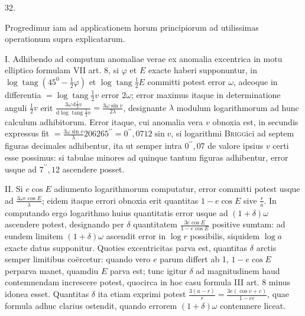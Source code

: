 \begin{center}
\hypertarget{native-047-article032}{}32.
\end{center}
Progredimur iam ad applicationem horum principiorum ad utilissimas operationum supra explicatarum.

I. Adhibendo ad computum anomaliae verae ex anomalia excentrica in motu elliptico formulam VII art. 8, si $\varphi$ et $E$ exacte haberi supponuntur, in $\log\operatorname{tang}(45^0-\frac{1}{2}\varphi)$ et $\log\operatorname{tang}\frac{1}{2}E$ committi potest error $\omega$, adeoque in differentia $=\log\operatorname{tang}\frac{1}{2}v$ error $2\omega$; error maximus itaque in determinatione anguli $\frac{1}{2}v$ erit $\frac{3\omega\,\mathrm{d}\frac{1}{2}v}{\mathrm{d}\log\operatorname{tang}\frac{1}{2}v}=\frac{3\omega\sin v}{2\lambda}$, designante $\lambda$ modulum logarithmorum ad hunc calculum adhibitorum. Error itaque, cui anomalia vera $v$ obnoxia est, in secundis expressus fit $=\frac{3\omega\sin v}{\lambda}206265^{\prime\prime}=0^{\prime\prime}{,}0712\sin v$, si logarithmi \textsc{Brigg}ici ad septem figuras decimales adhibentur, ita ut semper intra $0^{\prime\prime}{,}07$ de valore ipsius $v$ certi esse possimus: si tabulae minores ad quinque tantum figuras adhibentur, error usque ad $7^{\prime\prime}{,}12$ ascendere posset.

II. Si $e\cos E$ adiumento logarithmorum computatur, error committi potest usque ad $\frac{3\omega e\cos E}{\lambda}$; eidem itaque errori obnoxia erit quantitas $1-e\cos E$ sive $\frac{r}{a}$. In computando ergo logarithmo huius quantitatis error usque ad $(1+\delta)\omega$ ascendere potest, designando per $\delta$ quantitatem $\frac{3e\cos E}{1-e\cos E}$ positive sumtam: ad eundem limitem $(1+\delta)\omega$ ascendit error in $\log r$ possibilis, siquidem $\log a$ exacte datus supponitur. Quoties excentricitas parva est, quantitas $\delta$ arctis semper limitibus coërcetur: quando vero $e$ parum differt ab 1, $1-e\cos E$ perparva manet, quamdiu $E$ parva est; tunc igitur $\delta$ ad magnitudinem haud contemnendam increscere potest, quocirca in hoc casu formula III art. 8 minus idonea esset. Quantitas $\delta$ ita etiam exprimi potest $\frac{3(a-r)}{r}=\frac{3e(\cos v+e)}{1-ee}$, quae formula adhuc clarius ostendit, quando errorem $(1+\delta)\omega$ contemnere liceat.

